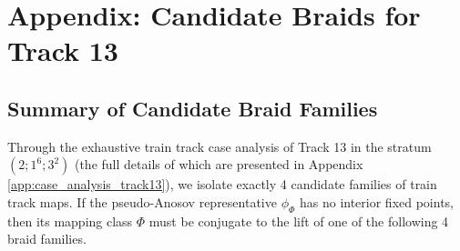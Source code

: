 \chapter[Appendix: Candidate Braids for Track 13]{Appendix: Candidate Braids for Track 13}
\label{app:candidate_braids_track_13}

\section{Summary of Candidate Braid Families}
\label{sec:summary_track13_braids}

Through the exhaustive train track case analysis of Track 13 in the stratum $(2;1^6;3^2)$ (the full details of which are presented in Appendix \ref{app:case_analysis_track13}), we isolate exactly 4 candidate families of train track maps. If the pseudo-Anosov representative $\phi_\Phi$ has no interior fixed points, then its mapping class $\Phi$ must be conjugate to the lift of one of the following 4 braid families.

